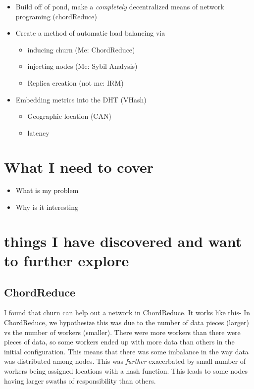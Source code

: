 \documentclass[10pt,letterpaper,twoside]{report}
\begin{document}
\begin{itemize}
	\item Build off of pond, make a \textit{completely} decentralized means of network programing (chordReduce)
	\item Create a method of automatic load balancing via
	\begin{itemize}
		\item inducing churn (Me: ChordReduce)
		\item injecting nodes (Me: Sybil Analysis)
		\item Replica creation (not me: IRM)
	\end{itemize}
	\item Embedding metrics into the DHT (VHash)
    \begin{itemize}
        \item Geographic location (CAN)
        \item latency 
    \end{itemize}
\end{itemize}



\section{What I need to cover}

\begin{itemize}
	\item What is my problem
	\item  Why is it interesting
\end{itemize}


\section{things I have discovered and want to further explore}


\subsection{ChordReduce}
I found that churn can help out a network in ChordReduce.
It works like this-
In ChordReduce, we hypothesize this was due to the number of data pieces (larger) vs the number of workers (smaller).
There were more workers than there were pieces of data, so some workers ended up with more data than others in the initial configuration.
This means that there was some imbalance in the way data was distributed among nodes.
This was \textit{further} exacerbated by small number of workers being assigned locations with a hash function.
This leads to some nodes having larger swaths of responsibility than others.
\end{document}
